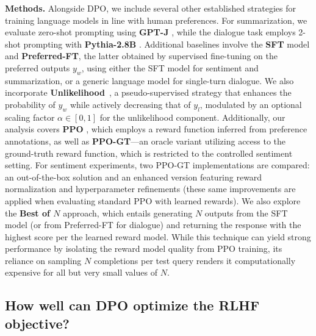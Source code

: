 \textbf{Methods.} Alongside DPO, we include several other established strategies for training language models in line with human preferences. For summarization, we evaluate zero-shot prompting using \textbf{GPT-J} \citep{gpt-j}, while the dialogue task employs 2-shot prompting with \textbf{Pythia-2.8B} \citep{biderman2023pythia}. Additional baselines involve the \textbf{SFT} model and \textbf{Preferred-FT}, the latter obtained by supervised fine-tuning on the preferred outputs $y_w$, using either the SFT model for sentiment and summarization, or a generic language model for single-turn dialogue. We also incorporate \textbf{Unlikelihood}~\citep{welleck2019neural}, a pseudo-supervised strategy that enhances the probability of $y_w$ while actively decreasing that of $y_l$, modulated by an optional scaling factor $\alpha\in[0,1]$ for the unlikelihood component. Additionally, our analysis covers \textbf{PPO} \citep{schulman2017proximal}, which employs a reward function inferred from preference annotations, as well as \textbf{PPO-GT}—an oracle variant utilizing access to the ground-truth reward function, which is restricted to the controlled sentiment setting. For sentiment experiments, two PPO-GT implementations are compared: an out-of-the-box solution \cite{leandro_von_werra_2023_7790115} and an enhanced version featuring reward normalization and hyperparameter refinements (these same improvements are applied when evaluating standard PPO with learned rewards). We also explore the \textbf{Best of $N$} approach, which entails generating $N$ outputs from the SFT model (or from Preferred-FT for dialogue) and returning the response with the highest score per the learned reward model. While this technique can yield strong performance by isolating the reward model quality from PPO training, its reliance on sampling $N$ completions per test query renders it computationally expensive for all but very small values of $N$.

\subsection{How well can DPO optimize the RLHF objective?}

